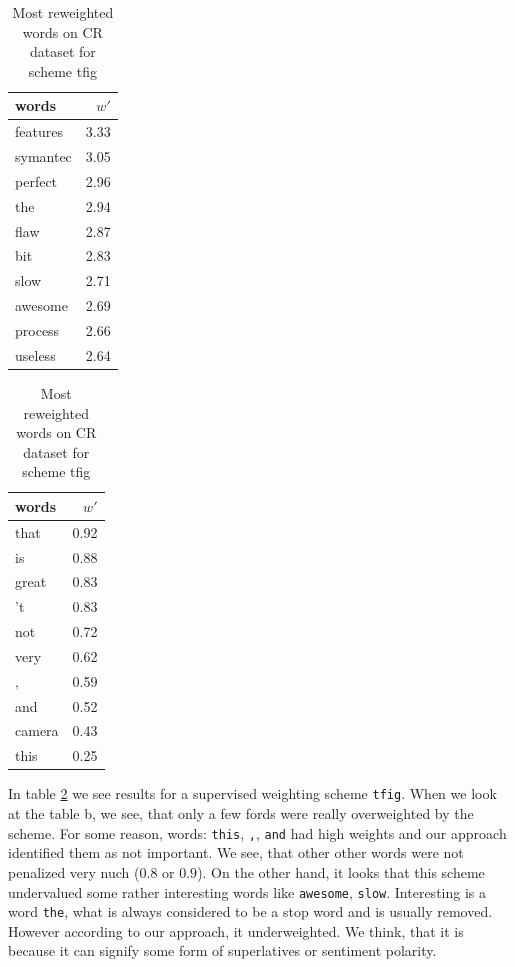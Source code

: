 \begin{table}[h]
    \centering
    \begin{minipage}{.4\linewidth}
      \centering
        \begin{tabular}{lr}
\toprule
    words &  $w'$ \\
\midrule
 features &  3.33 \\
 symantec &  3.05 \\
  perfect &  2.96 \\
      the &  2.94 \\
     flaw &  2.87 \\
      bit &  2.83 \\
     slow &  2.71 \\
  awesome &  2.69 \\
  process &  2.66 \\
  useless &  2.64 \\
\bottomrule
\end{tabular}

    \end{minipage}
    \begin{minipage}{.4\linewidth}
      \centering
        \begin{tabular}{lr}
\toprule
  words &  $w'$ \\
\midrule
   that &  0.92 \\
     is &  0.88 \\
  great &  0.83 \\
     't &  0.83 \\
    not &  0.72 \\
   very &  0.62 \\
      , &  0.59 \\
    and &  0.52 \\
 camera &  0.43 \\
   this &  0.25 \\
\bottomrule
\end{tabular}

    \end{minipage} 
    \caption{Most reweighted words on CR dataset for scheme tfig}
    \label{tab:words:CR:tfig}
\end{table}

    In table \ref{tab:words:CR:tfig} we see results for a supervised weighting scheme \texttt{tfig}.
    When we look at the table b, we see, that only a few fords were really overweighted by the scheme. 
    For some reason, words: \texttt{this}, \texttt{,}, \texttt{and} had high weights and our approach identified them as not important.
    We see, that other other words were not penalized very nuch ($0.8$ or $0.9$).
    On the other hand, it looks that this scheme undervalued some rather interesting words like \texttt{awesome}, \texttt{slow}.
    Interesting is a word \texttt{the}, what is always considered to be a stop word and is usually removed. 
    However according to our approach, it underweighted. 
    We think, that it is because it can signify some form of superlatives or sentiment polarity.
    

